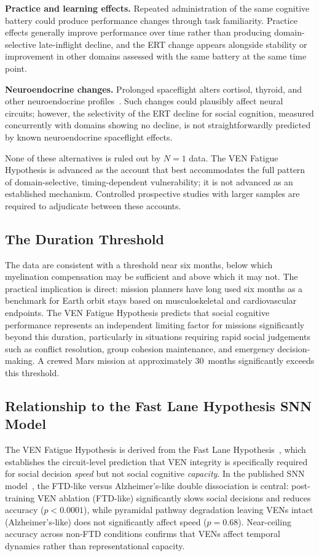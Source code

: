 \documentclass[11pt]{article}
\begin{document}
\textbf{Practice and learning effects.}
Repeated administration of the same cognitive battery could produce
performance changes through task familiarity.
Practice effects generally improve performance over time rather than
producing domain-selective late-inflight decline, and the ERT change appears
alongside stability or improvement in other domains assessed with the same
battery at the same time point.

\textbf{Neuroendocrine changes.}
Prolonged spaceflight alters cortisol, thyroid, and other neuroendocrine
profiles~\cite{garrett2019}.
Such changes could plausibly affect neural circuits; however, the
selectivity of the ERT decline for social cognition, measured concurrently
with domains showing no decline, is not straightforwardly predicted by
known neuroendocrine spaceflight effects.

None of these alternatives is ruled out by $N=1$ data.
The VEN Fatigue Hypothesis is advanced as the account that best accommodates
the full pattern of domain-selective, timing-dependent vulnerability; it
is not advanced as an established mechanism.
Controlled prospective studies with larger samples are required to
adjudicate between these accounts.

\subsection{The Duration Threshold}

The data are consistent with a threshold near six months, below which
myelination compensation may be sufficient and above which it may not.
The practical implication is direct: mission planners have long used
six months as a benchmark for Earth orbit stays based on musculoskeletal
and cardiovascular endpoints.
The VEN Fatigue Hypothesis predicts that social cognitive performance
represents an independent limiting factor for missions significantly
beyond this duration, particularly in situations requiring rapid social
judgements such as conflict resolution, group cohesion maintenance, and
emergency decision-making.
A crewed Mars mission at approximately 30~months significantly exceeds
this threshold.

\subsection{Relationship to the Fast Lane Hypothesis SNN Model}

The VEN Fatigue Hypothesis is derived from the Fast Lane
Hypothesis~\cite{keskin2026}, which establishes the circuit-level
prediction that VEN integrity is specifically required for social decision
\emph{speed} but not social cognitive \emph{capacity}.
In the published SNN model~\cite{keskin2026}, the FTD-like versus
Alzheimer's-like double dissociation is central: post-training VEN ablation
(FTD-like) significantly slows social decisions and reduces accuracy
($p<0.0001$), while pyramidal pathway degradation leaving VENs intact
(Alzheimer's-like) does not significantly affect speed ($p=0.68$).
Near-ceiling accuracy across non-FTD conditions confirms that VENs affect
temporal dynamics rather than representational capacity.
\end{document}
